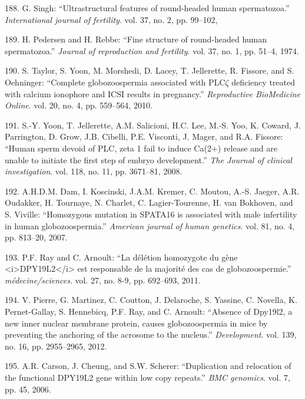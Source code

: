 \documentclass[12pt,a4paper,twoside]{ugathesis}
\theoremstyle{definition}
\theoremstyle{definition}
\theoremstyle{definition}
\theoremstyle{remark}
\begin{document}
\hypertarget{ref-Singh}{}
188. G. Singh: ``Ultrastructural features of round-headed human
spermatozoa.'' \emph{International journal of fertility}. vol. 37, no.
2, pp. 99--102,

\hypertarget{ref-Pedersen1974}{}
189. H. Pedersen and H. Rebbe: ``Fine structure of round-headed human
spermatozoa.'' \emph{Journal of reproduction and fertility}. vol. 37,
no. 1, pp. 51--4, 1974.

\hypertarget{ref-Taylor2010}{}
190. S. Taylor, S. Yoon, M. Morshedi, D. Lacey, T. Jellerette, R.
Fissore, and S. Oehninger: ``Complete globozoospermia associated with
PLC\(\zeta\) deficiency treated with calcium ionophore and ICSI results
in pregnancy.'' \emph{Reproductive BioMedicine Online}. vol. 20, no. 4,
pp. 559--564, 2010.

\hypertarget{ref-Yoon2008}{}
191. S.-Y. Yoon, T. Jellerette, A.M. Salicioni, H.C. Lee, M.-S. Yoo, K.
Coward, J. Parrington, D. Grow, J.B. Cibelli, P.E. Visconti, J. Mager,
and R.A. Fissore: ``Human sperm devoid of PLC, zeta 1 fail to induce
Ca(2+) release and are unable to initiate the first step of embryo
development.'' \emph{The Journal of clinical investigation}. vol. 118,
no. 11, pp. 3671--81, 2008.

\hypertarget{ref-Dam2007}{}
192. A.H.D.M. Dam, I. Koscinski, J.A.M. Kremer, C. Moutou, A.-S. Jaeger,
A.R. Oudakker, H. Tournaye, N. Charlet, C. Lagier-Tourenne, H. van
Bokhoven, and S. Viville: ``Homozygous mutation in SPATA16 is associated
with male infertility in human globozoospermia.'' \emph{American journal
of human genetics}. vol. 81, no. 4, pp. 813--20, 2007.

\hypertarget{ref-Ray2011}{}
193. P.F. Ray and C. Arnoult: ``La délétion homozygote du gène
\textless{}i\textgreater{}DPY19L2\textless{}/i\textgreater{} est
responsable de la majorité des cas de globozoospermie.''
\emph{médecine/sciences}. vol. 27, no. 8-9, pp. 692--693, 2011.

\hypertarget{ref-Pierre2012}{}
194. V. Pierre, G. Martinez, C. Coutton, J. Delaroche, S. Yassine, C.
Novella, K. Pernet-Gallay, S. Hennebicq, P.F. Ray, and C. Arnoult:
``Absence of Dpy19l2, a new inner nuclear membrane protein, causes
globozoospermia in mice by preventing the anchoring of the acrosome to
the nucleus.'' \emph{Development}. vol. 139, no. 16, pp. 2955--2965,
2012.

\hypertarget{ref-Carson2006}{}
195. A.R. Carson, J. Cheung, and S.W. Scherer: ``Duplication and
relocation of the functional DPY19L2 gene within low copy repeats.''
\emph{BMC genomics}. vol. 7, pp. 45, 2006.
\end{document}

